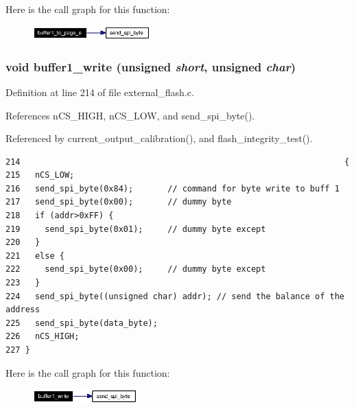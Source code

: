 Here is the call graph for this function:\begin{figure}[H]
\begin{center}
\leavevmode
\includegraphics[width=128pt]{external__flash_8h_a10_cgraph}
\end{center}
\end{figure}
\subsubsection{\setlength{\rightskip}{0pt plus 5cm}void buffer1\_\-write (unsigned {\em short}, unsigned {\em char})}\label{external__flash_8h_a13}




Definition at line 214 of file external\_\-flash.c.

References n\-CS\_\-HIGH, n\-CS\_\-LOW, and send\_\-spi\_\-byte().

Referenced by current\_\-output\_\-calibration(), and flash\_\-integrity\_\-test().

\footnotesize\begin{verbatim}214                                                                  {
215   nCS_LOW;
216   send_spi_byte(0x84);       // command for byte write to buff 1
217   send_spi_byte(0x00);       // dummy byte
218   if (addr>0xFF) {
219     send_spi_byte(0x01);     // dummy byte except 
220   }
221   else {
222     send_spi_byte(0x00);     // dummy byte except 
223   }  
224   send_spi_byte((unsigned char) addr); // send the balance of the address
225   send_spi_byte(data_byte);
226   nCS_HIGH; 
227 }
\end{verbatim}\normalsize 




Here is the call graph for this function:\begin{figure}[H]
\begin{center}
\leavevmode
\includegraphics[width=114pt]{external__flash_8h_a13_cgraph}
\end{center}
\end{figure}
